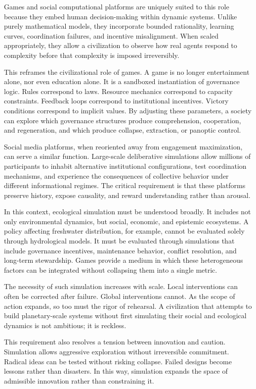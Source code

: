 \documentclass[12pt,oneside]{book}
\begin{document}
Games and social computational platforms are uniquely suited to this role because they embed human decision-making within dynamic systems. Unlike purely mathematical models, they incorporate bounded rationality, learning curves, coordination failures, and incentive misalignment. When scaled appropriately, they allow a civilization to observe how real agents respond to complexity before that complexity is imposed irreversibly.

This reframes the civilizational role of games. A game is no longer entertainment alone, nor even education alone. It is a sandboxed instantiation of governance logic. Rules correspond to laws. Resource mechanics correspond to capacity constraints. Feedback loops correspond to institutional incentives. Victory conditions correspond to implicit values. By adjusting these parameters, a society can explore which governance structures produce comprehension, cooperation, and regeneration, and which produce collapse, extraction, or panoptic control.

Social media platforms, when reoriented away from engagement maximization, can serve a similar function. Large-scale deliberative simulations allow millions of participants to inhabit alternative institutional configurations, test coordination mechanisms, and experience the consequences of collective behavior under different informational regimes. The critical requirement is that these platforms preserve history, expose causality, and reward understanding rather than arousal.

In this context, ecological simulation must be understood broadly. It includes not only environmental dynamics, but social, economic, and epistemic ecosystems. A policy affecting freshwater distribution, for example, cannot be evaluated solely through hydrological models. It must be evaluated through simulations that include governance incentives, maintenance behavior, conflict resolution, and long-term stewardship. Games provide a medium in which these heterogeneous factors can be integrated without collapsing them into a single metric.

The necessity of such simulation increases with scale. Local interventions can often be corrected after failure. Global interventions cannot. As the scope of action expands, so too must the rigor of rehearsal. A civilization that attempts to build planetary-scale systems without first simulating their social and ecological dynamics is not ambitious; it is reckless.

This requirement also resolves a tension between innovation and caution. Simulation allows aggressive exploration without irreversible commitment. Radical ideas can be tested without risking collapse. Failed designs become lessons rather than disasters. In this way, simulation expands the space of admissible innovation rather than constraining it.
\end{document}
